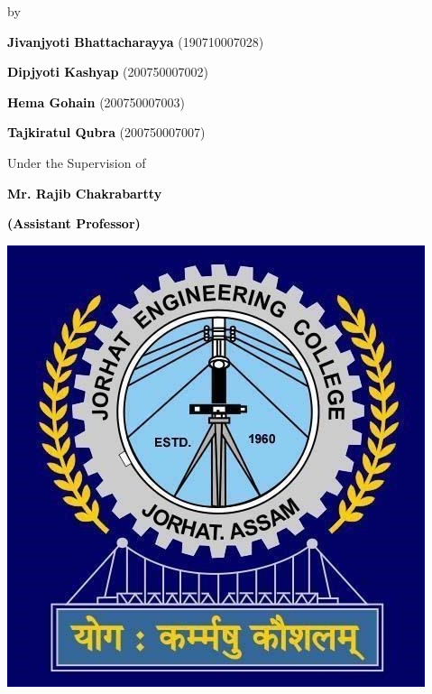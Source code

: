 \begin{titlepage}
\begin{center}
    

\vspace{3mm}
    {\large by\par}
    \vspace{0.05cm}
    {\large \textbf{\textcolor{black}{Jivanjyoti Bhattacharayya}}  (190710007028)\par} 
    {\large \textbf{\textcolor{black}{Dipjyoti Kashyap}}  (200750007002)\par} 
    {\large \textbf{\textcolor{black}{Hema Gohain}}  (200750007003)\par} 
    {\large \textbf{\textcolor{black}{Tajkiratul Qubra}}  (200750007007)\par} 
    \vspace{0.4cm}
    
    { Under the Supervision of \par}
    {\large \textbf{\textbf{\textcolor{black}{Mr. Rajib Chakrabartty}}}\par}
    {\large \textbf{\textbf{\textcolor{black}{(Assistant Professor)}}}\par}
     \vspace{0.2 cm}

\includegraphics[width=0.28\linewidth]{Images/jec_logo.png}
     \vspace{0.1 cm}


\end{center}
\end{titlepage}
